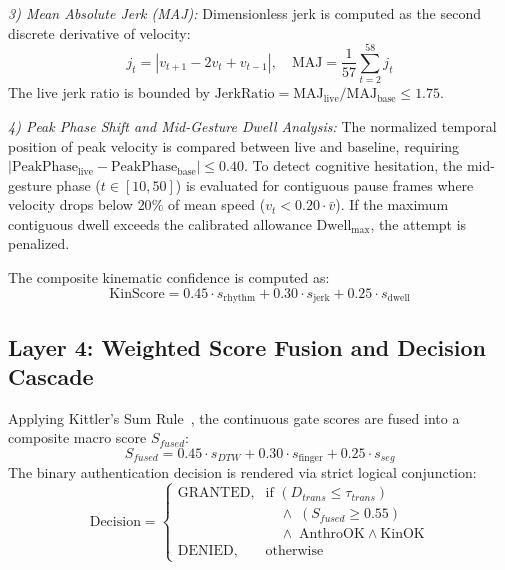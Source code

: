 \documentclass[conference]{IEEEtran}
\begin{document}
\textit{3) Mean Absolute Jerk (MAJ):} Dimensionless jerk is computed as the second discrete derivative of velocity:
\begin{equation}
j_t = |v_{t+1} - 2v_t + v_{t-1}|, \quad \text{MAJ} = \frac{1}{57}\sum_{t=2}^{58} j_t
\end{equation}
The live jerk ratio is bounded by $\text{JerkRatio} = \text{MAJ}_{\text{live}} / \text{MAJ}_{\text{base}} \le 1.75$.

\textit{4) Peak Phase Shift and Mid-Gesture Dwell Analysis:} The normalized temporal position of peak velocity is compared between live and baseline, requiring $|\text{PeakPhase}_{\text{live}} - \text{PeakPhase}_{\text{base}}| \le 0.40$. To detect cognitive hesitation, the mid-gesture phase ($t \in [10, 50]$) is evaluated for contiguous pause frames where velocity drops below $20\%$ of mean speed ($v_t < 0.20 \cdot \bar{v}$). If the maximum contiguous dwell exceeds the calibrated allowance $\text{Dwell}_{\max}$, the attempt is penalized.

The composite kinematic confidence is computed as:
\begin{equation}
\text{KinScore} = 0.45 \cdot s_{\text{rhythm}} + 0.30 \cdot s_{\text{jerk}} + 0.25 \cdot s_{\text{dwell}}
\end{equation}

\subsection{Layer 4: Weighted Score Fusion and Decision Cascade}

Applying Kittler's Sum Rule~\cite{kittler1998}, the continuous gate scores are fused into a composite macro score $S_{fused}$:
\begin{equation}
S_{fused} = 0.45 \cdot s_{DTW} + 0.30 \cdot s_{\text{finger}} + 0.25 \cdot s_{seg}
\label{eq:score_fusion}
\end{equation}
The binary authentication decision is rendered via strict logical conjunction:
\begin{equation}
\text{Decision} = \begin{cases}
\text{GRANTED}, & \text{if } (D_{trans} \le \tau_{trans}) \\
& \quad \wedge\; (S_{fused} \ge 0.55) \\
& \quad \wedge\; \text{AnthroOK} \wedge \text{KinOK} \\
\text{DENIED}, & \text{otherwise}
\end{cases}
\label{eq:final_decision}
\end{equation}
\end{document}

